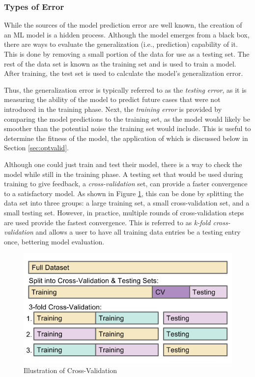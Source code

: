\subsubsection{Types of Error}

While the sources of the model prediction error are well known, the creation of
an \gls{ML} model is a hidden process. Although the model emerges
from a black box, there are ways to evaluate the generalization (i.e.,
prediction) capability of it.  This is done by removing a small portion of the
data for use as a testing set.  The rest of the data set is known as the
training set and is used to train a model. After training, the test set is used
to calculate the model's generalization error.  

Thus, the generalization error is typically referred to as the \textit{testing
error}, as it is measuring the ability of the model to predict future cases
that were not introduced in the training phase.
Next, the \textit{training error} is provided by comparing the model
predictions to the training set, as the model would likely be smoother than the
potential noise the training set would include. This is useful to determine the
fitness of the model, the application of which is discussed below in Section
\ref{sec:optvalid}.

Although one could just train and test their model, there is a way to check the
model while still in the training phase. A testing set that would be used
during training to give feedback, a \textit{cross-validation} set, can provide
a faster convergence to a satisfactory model. As shown in Figure
\ref{fig:cverror}, this can be done by splitting the data set into three
groups: a large training set, a small cross-validation set, and a small testing
set.  However, in practice, multiple rounds of cross-validation steps are used
provide the fastest convergence.  This is referred to as \textit{k-fold
cross-validation} and allows a user to have all training data entries be a
testing entry once, bettering model evaluation. 

\begin{figure}[!htb]
  \centering
  \includegraphics[width=0.85\linewidth]{./chapters/litrev/cverror.png}
  \caption{Illustration of Cross-Validation}
  \label{fig:cverror}
\end{figure}

